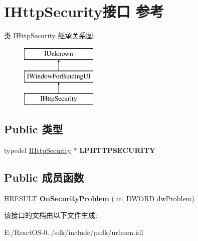 \hypertarget{interface_i_http_security}{}\section{I\+Http\+Security接口 参考}
\label{interface_i_http_security}
类 I\+Http\+Security 继承关系图\+:\begin{figure}[H]
\begin{center}
\leavevmode
\includegraphics[height=3.000000cm]{interface_i_http_security}
\end{center}
\end{figure}
\subsection*{Public 类型}
\begin{DoxyCompactItemize}
\item 
\mbox{\label{interface_i_http_security_aa8f2e1d2c8ec6afa19e2f08a9acb383e}} 
typedef \hyperlink{interface_i_http_security}{I\+Http\+Security} $\ast$ {\bfseries L\+P\+H\+T\+T\+P\+S\+E\+C\+U\+R\+I\+TY}
\end{DoxyCompactItemize}
\subsection*{Public 成员函数}
\begin{DoxyCompactItemize}
\item 
\mbox{\label{interface_i_http_security_a367a89e6593efbf17990614ea6125d07}} 
H\+R\+E\+S\+U\+LT {\bfseries On\+Security\+Problem} (\mbox{[}in\mbox{]} D\+W\+O\+RD dw\+Problem)
\end{DoxyCompactItemize}


该接口的文档由以下文件生成\+:\begin{DoxyCompactItemize}
\item 
E\+:/\+React\+O\+S-\/0../sdk/include/psdk/urlmon.\+idl\end{DoxyCompactItemize}
